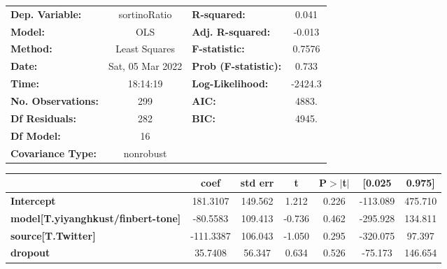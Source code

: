 \begin{center}
\begin{tabular}{lclc}
\toprule
\textbf{Dep. Variable:}                    &   sortinoRatio   & \textbf{  R-squared:         } &     0.041   \\
\textbf{Model:}                            &       OLS        & \textbf{  Adj. R-squared:    } &    -0.013   \\
\textbf{Method:}                           &  Least Squares   & \textbf{  F-statistic:       } &    0.7576   \\
\textbf{Date:}                             & Sat, 05 Mar 2022 & \textbf{  Prob (F-statistic):} &    0.733    \\
\textbf{Time:}                             &     18:14:19     & \textbf{  Log-Likelihood:    } &   -2424.3   \\
\textbf{No. Observations:}                 &         299      & \textbf{  AIC:               } &     4883.   \\
\textbf{Df Residuals:}                     &         282      & \textbf{  BIC:               } &     4945.   \\
\textbf{Df Model:}                         &          16      & \textbf{                     } &             \\
\textbf{Covariance Type:}                  &    nonrobust     & \textbf{                     } &             \\
\bottomrule
\end{tabular}
\begin{tabular}{lcccccc}
                                           & \textbf{coef} & \textbf{std err} & \textbf{t} & \textbf{P$> |$t$|$} & \textbf{[0.025} & \textbf{0.975]}  \\
\midrule
\textbf{Intercept}                         &     181.3107  &      149.562     &     1.212  &         0.226        &     -113.089    &      475.710     \\
\textbf{model[T.yiyanghkust/finbert-tone]} &     -80.5583  &      109.413     &    -0.736  &         0.462        &     -295.928    &      134.811     \\
\textbf{source[T.Twitter]}                 &    -111.3387  &      106.043     &    -1.050  &         0.295        &     -320.075    &       97.397     \\
\textbf{dropout}                           &      35.7408  &       56.347     &     0.634  &         0.526        &      -75.173    &      146.654     \\

\end{tabular}
\end{center}
